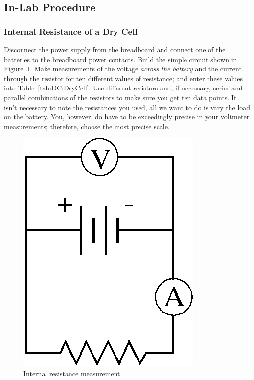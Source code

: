 \subsection{In-Lab Procedure}
\subsubsection{Internal Resistance of a Dry Cell} 

Disconnect the power supply from the breadboard and connect one of the 
batteries to the breadboard power contacts. Build the simple circuit
shown in Figure~\ref{fig:DC:procintresist}.
Make measurements of the voltage {\it across the battery} and the current
through the resistor for ten different values of resistance; and enter 
these values into Table~\ref{tab:DC:DryCell}. Use
different resistors and, if necessary, series and parallel combinations
of the resistors to make sure you get ten data points. It isn't necessary to
note the resistances you used, all we want to do is vary the load on the 
battery. You, however, do have to be exceedingly precise in your voltmeter 
measurements; therefore, choose the most precise scale.
\begin{figure}[htb]
\centering \epsfxsize=3cm \includegraphics[scale=0.7]{2_dc/procintresist.eps}
\caption{Internal resistance measurement.}
\label{fig:DC:procintresist}
\end{figure}
